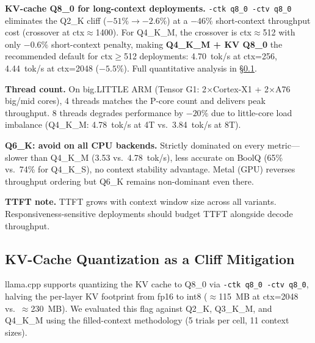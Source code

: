 \documentclass[conference]{IEEEtran}
\begin{document}
\textbf{KV-cache Q8\_0 for long-context deployments.}
\texttt{-ctk q8\_0 -ctv q8\_0} eliminates the Q2\_K cliff ($-51\%\to-2.6\%$) at a
$-46\%$ short-context throughput cost (crossover at ctx$\approx$1400).
For Q4\_K\_M, the crossover is ctx$\approx$512 with only $-0.6\%$ short-context penalty,
making \textbf{Q4\_K\_M + KV Q8\_0} the recommended default for ctx$\geq$512 deployments:
4.70~tok/s at ctx=256, 4.44~tok/s at ctx=2048 ($-5.5\%$).
Full quantitative analysis in \S\ref{sec:kvcache_quant}.

\textbf{Thread count.}
On big.LITTLE ARM (Tensor G1: 2$\times$Cortex-X1 + 2$\times$A76 big/mid cores),
4 threads matches the P-core count and delivers peak throughput.
8 threads degrades performance by $-20\%$ due to little-core load imbalance
(Q4\_K\_M: 4.78~tok/s at 4T vs.\ 3.84~tok/s at 8T).

\textbf{Q6\_K: avoid on all CPU backends.}
Strictly dominated on every metric---slower than Q4\_K\_M (3.53 vs.\ 4.78~tok/s),
less accurate on BoolQ (65\% vs.\ 74\% for Q4\_K\_S), no context stability advantage.
Metal (GPU) reverses throughput ordering but Q6\_K remains non-dominant even there.

\textbf{TTFT note.}
TTFT grows with context window size across all variants.
Responsiveness-sensitive deployments should budget TTFT alongside decode throughput.

\subsection{KV-Cache Quantization as a Cliff Mitigation}
\label{sec:kvcache_quant}

llama.cpp supports quantizing the KV cache to Q8\_0 via \texttt{-ctk q8\_0 -ctv q8\_0},
halving the per-layer KV footprint from fp16 to int8 ($\approx$115~MB at ctx=2048 vs.\
$\approx$230~MB).
We evaluated this flag against Q2\_K, Q3\_K\_M, and Q4\_K\_M using the filled-context
methodology (5 trials per cell, 11 context sizes).
\end{document}
